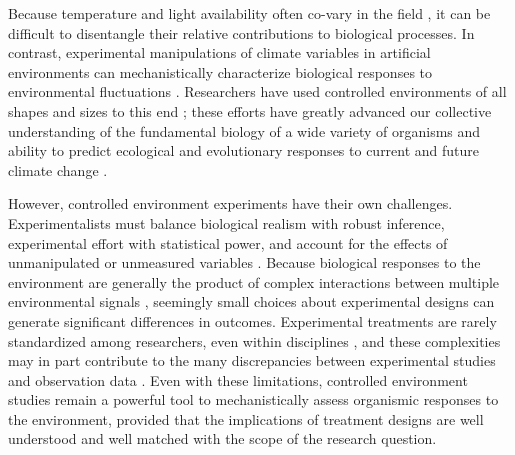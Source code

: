 \documentclass[11pt]{article}
\begin{document}
\noindent Because temperature and light availability often co-vary in the field \citep[for example, in most temperate ecosystems, daylength and temperature both increase as the season progresses,][]{Rosenberg1974}, it can be difficult to disentangle their relative contributions to biological processes. In contrast, experimental manipulations of climate variables in artificial environments can mechanistically characterize biological responses to environmental fluctuations \citep{Ettinger:2020aa,Primack2015}. Researchers have used controlled environments of all shapes and sizes to this end \citep{Downs:1980us}; these efforts have greatly advanced our collective understanding of the fundamental biology of a wide variety of organisms and ability to predict ecological and evolutionary responses to current and future climate change \citep{Stewart:2013wz}.

However, controlled environment experiments have their own challenges. Experimentalists must balance biological realism with robust inference, experimental effort with statistical power, and account for the effects of unmanipulated or unmeasured variables \citep{schneiner2001}. Because biological responses to the environment are generally the product of complex interactions between multiple environmental signals \citep{Casal:2002vz}, seemingly small choices about experimental designs can generate significant differences in outcomes. Experimental treatments are rarely standardized among researchers, even within disciplines \citep{Wolkovich:2022ue}, and these complexities may in part contribute to the many discrepancies between experimental studies and observation data \citep{Poorter:2016aa}. Even with these limitations, controlled environment studies remain a powerful tool to mechanistically assess organismic responses to the environment, provided that the implications of treatment designs are well understood and well matched with the scope of the research question. 
\end{document}
